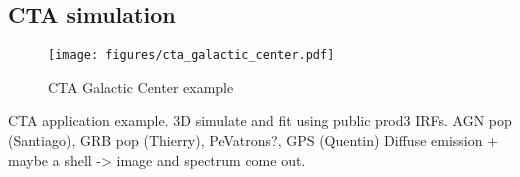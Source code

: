 \subsection{CTA simulation}
\label{ssec:cta-simulation}

\begin{figure*}[t]
	\centering
	\texttt{[image: figures/cta\_galactic\_center.pdf]}
	\caption{CTA Galactic Center example}
	\label{fig:cta_galactic_center}
\end{figure*}

CTA application example. 3D simulate and fit using public prod3 IRFs. AGN pop
(Santiago), GRB pop (Thierry), PeVatrons?, GPS (Quentin) Diffuse emission +
maybe a shell -> image and spectrum come out.
